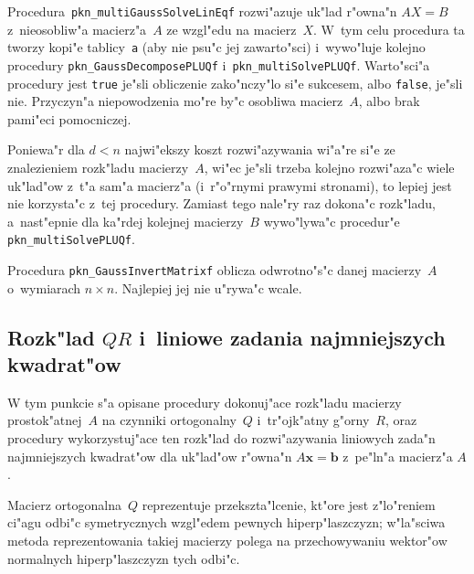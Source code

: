 \vspace{\bigskipamount}
Procedura~\texttt{pkn\_multiGaussSolveLinEqf} rozwi"azuje uk"lad r"owna"n
$AX=B$ z~nieosobliw"a macierz"a~$A$ ze wzgl"edu na macierz~$X$.
W~tym celu procedura ta tworzy kopi"e tablicy~\texttt{a}
(aby nie psu"c jej zawarto"sci)
i~wywo"luje kolejno procedury \texttt{pkn\_GaussDecomposePLUQf}
i~\texttt{pkn\_multiSolvePLUQf}. Warto"sci"a procedury jest \texttt{true}
je"sli obliczenie zako"nczy"lo si"e sukcesem, albo \texttt{false}, je"sli nie.
Przyczyn"a niepowodzenia mo"re by"c osobliwa macierz~$A$, albo brak pami"eci
pomocniczej.

Poniewa"r dla $d<n$ najwi"ekszy koszt rozwi"azywania wi"a"re si"e ze znalezieniem
rozk"ladu macierzy~$A$, wi"ec je"sli trzeba kolejno rozwi"aza"c wiele
uk"lad"ow z~t"a sam"a macierz"a (i~r"o"rnymi prawymi stronami), to lepiej jest
nie korzysta"c z~tej procedury. Zamiast tego nale"ry raz dokona"c rozk"ladu,
a~nast"epnie dla ka"rdej kolejnej macierzy~$B$ wywo"lywa"c procedur"e
\texttt{pkn\_multiSolvePLUQf}.

\vspace{\bigskipamount}
\begin{sloppypar}
Procedura \texttt{pkn\_GaussInvertMatrixf} oblicza odwrotno"s"c danej
macierzy~$A$ o~wymiarach $n\times n$. Najlepiej jej nie u"rywa"c wcale.%
\end{sloppypar}


\newpage
\subsection{\label{ssect:QR}Rozk"lad $QR$ i~liniowe zadania najmniejszych
  kwadrat"ow}

W tym punkcie s"a opisane procedury dokonuj"ace rozk"ladu macierzy
prostok"atnej~$A$ na czynniki ortogonalny~$Q$ i~tr"ojk"atny g"orny~$R$, oraz
procedury wykorzystuj"ace ten rozk"lad do rozwi"azywania liniowych zada"n
najmniejszych kwadrat"ow dla uk"lad"ow r"owna"n $A\bm{x}=\bm{b}$ z~pe"ln"a
macierz"a $A$.

Macierz ortogonalna~$Q$ reprezentuje przekszta"lcenie, kt"ore jest
z"lo"reniem ci"agu odbi"c symetrycznych wzgl"edem pewnych hiperp"laszczyzn;
w"la"sciwa metoda reprezentowania takiej macierzy polega na przechowywaniu
wektor"ow normalnych hiperp"laszczyzn tych odbi"c.

